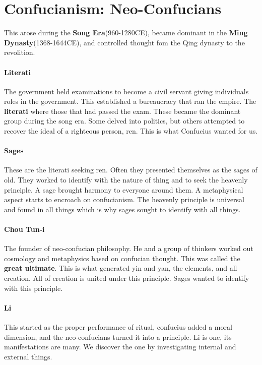 \documentclass{article}
\begin{document}
\section*{Confucianism: Neo-Confucians}
\label{sec:confucianism_neo_confucians}
This arose during the \textbf{Song Era}(960-1280CE), became dominant in the \textbf{Ming Dynasty}(1368-1644CE), and controlled thought fom the Qing dynasty to the revolition.

\paragraph{Literati}
\label{par:literati}
The government held examinations to become a civil servant giving individuals roles in the government. This established a bureaucracy that ran the empire. The \textbf{literati} where those that had passed the exam. These became the dominant group during the song era. Some delved into politics, but others attempted to recover the ideal of a righteous person, ren. This is what Confucius wanted for us.

\paragraph{Sages}
\label{par:sages}
These are the literati seeking ren. Often they presented themselves as the sages of old. They worked to identify with the nature of thing and to seek the heavenly principle. A sage brought harmony to everyone around them. A metaphysical aspect starts to encroach on confucianism. The heavenly principle is universal and found in all things which is why sages sought to identify with all things.

\paragraph{Chou Tun-i}
\label{par:chou_tun_i}
The founder of neo-confucian philosophy. He and a group of thinkers worked out cosmology and metaphysics based on confucian thought. This was called the \textbf{great ultimate}. This is what generated yin and yan, the elements, and all creation. All of creation is united under this principle. Sages wanted to identify with this principle.

\paragraph{Li}
\label{par:li2}
This started as the proper performance of ritual, confucius added a moral dimension, and the neo-confucians turned it into a principle. Li is one, its manifestations are many. We discover the one by investigating internal and external things.
\end{document}
